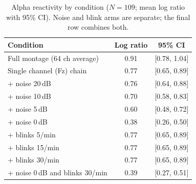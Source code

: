 \begin{table}[H]
  \centering
  \caption{Alpha reactivity by condition ($N=109$; mean log ratio with 95\% CI). Noise
  and blink arms are separate; the final row combines both.}
  \label{tab:alpha}
  \begin{tabular}{lcc}
    \hline
    Condition & Log ratio & 95\% CI \\
    \hline
    Full montage (64 ch average) & 0.91 & [0.78, 1.04] \\
    Single channel (Fz) chain & 0.77 & [0.65, 0.89] \\
    + noise 20\,dB & 0.76 & [0.64, 0.88] \\
    + noise 10\,dB & 0.70 & [0.58, 0.83] \\
    + noise 5\,dB & 0.60 & [0.48, 0.72] \\
    + noise 0\,dB & 0.38 & [0.26, 0.50] \\
    + blinks 5/min & 0.77 & [0.65, 0.89] \\
    + blinks 15/min & 0.77 & [0.65, 0.89] \\
    + blinks 30/min & 0.77 & [0.65, 0.89] \\
    + noise 0\,dB and blinks 30/min & 0.39 & [0.27, 0.51] \\
    \hline
  \end{tabular}
\end{table}
